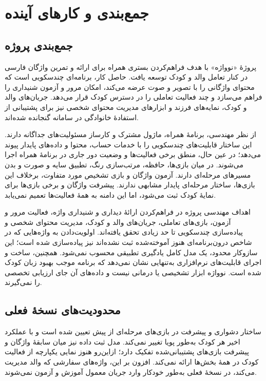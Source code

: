 \chapter{جمع‌بندی و کارهای آینده}\label{Chap:Conclusion}

\section{جمع‌بندی پروژه}

پروژهٔ «نوواژه» با هدف فراهم‌کردن بستری همراه برای ارائه و تمرین واژگان فارسی در کنار تعامل والد و کودک توسعه یافت. حاصل کار، برنامه‌ای چندسکویی است که محتوای واژگانی را با تصویر و صوت عرضه می‌کند، امکان مرور و آزمون شنیداری را فراهم می‌سازد و چند فعالیت تعاملی را در دسترس کودک قرار می‌دهد. جریان‌های والد و کودک، نمایه‌های فرزند و ابزارهای مدیریت محتوای شخصی نیز برای پشتیبانی از استفادهٔ خانوادگی در سامانه گنجانده شده‌اند.

از نظر مهندسی، برنامهٔ همراه، ماژول مشترک و کارساز مسئولیت‌های جداگانه دارند. این ساختار قابلیت‌های چندسکویی را با خدمات حساب، محتوا و داده‌های پایدار پیوند می‌دهد؛ در عین حال، منطق برخی فعالیت‌ها و وضعیت دور جاری در برنامهٔ همراه اجرا می‌شوند. در میان بازی‌ها، حافظه، مرتب‌سازی رنگ، تطبیق سایه و صورت و بدن مسیرهای مرحله‌ای دارند. آزمون واژگان و بازی تشخیص مورد متفاوت، برخلاف این بازی‌ها، ساختار مرحله‌ای پایدار مشابهی ندارند. پیشرفت واژگان و برخی بازی‌ها برای نمایهٔ کودک ثبت می‌شود، اما این دامنه به همهٔ فعالیت‌ها تعمیم نمی‌یابد.

اهداف مهندسی پروژه در فراهم‌کردن ارائهٔ دیداری و شنیداری واژه، فعالیت مرور و آزمون، بازی‌های تعاملی، جریان‌های والد و کودک، مدیریت محتوای شخصی و پیاده‌سازی چندسکویی تا حد زیادی تحقق یافته‌اند. اولویت‌دادن به واژه‌هایی که در شاخص درون‌برنامه‌ای هنوز آموخته‌شده ثبت نشده‌اند نیز پیاده‌سازی شده است؛ این سازوکار محدود، یک مدل کامل یادگیری تطبیقی محسوب نمی‌شود. همچنین، ساخت و اجرای قابلیت‌های نرم‌افزاری به‌تنهایی نشان نمی‌دهد که برنامه موجب بهبود زبان کودک شده است. نوواژه ابزار تشخیصی یا درمانی نیست و داده‌های آن جای ارزیابی تخصصی را نمی‌گیرند.

\section{محدودیت‌های نسخهٔ فعلی}

ساختار دشواری و پیشرفت در بازی‌های مرحله‌ای از پیش تعیین شده است و با عملکرد اخیر هر کودک به‌طور پویا تغییر نمی‌کند. مدل ثبت داده نیز میان سابقهٔ واژگان و پیشرفت بازی‌های پشتیبانی‌شده تفکیک دارد؛ ازاین‌رو هنوز نمایی یکپارچه از فعالیت کودک در همهٔ بخش‌ها ارائه نمی‌کند. افزون بر این، واژه‌های سفارشی که والد مدیریت می‌کند، در نسخهٔ فعلی به‌طور خودکار وارد جریان معمول آموزش و آزمون نمی‌شوند.

